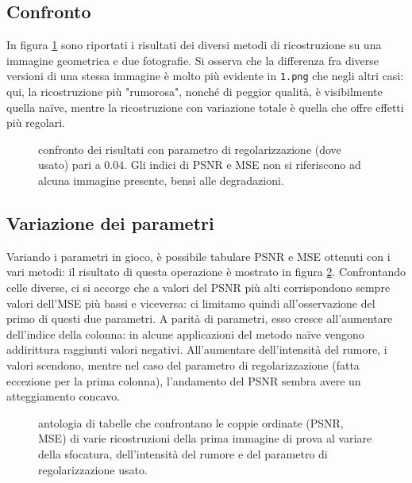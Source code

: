 \documentclass[a4paper]{article}
\begin{document}
\subsection{Confronto}
In figura \ref{fig:comparison} sono riportati i risultati dei diversi metodi di
ricostruzione su una immagine geometrica e due fotografie.
Si osserva che la differenza fra diverse versioni di una stessa immagine è molto
più evidente in \verb!1.png! che negli altri casi: qui, la ricostruzione più
"rumorosa", nonché di peggior qualità, è visibilmente quella naïve, mentre la
ricostruzione con variazione totale è quella che offre effetti più regolari.
\begin{figure}\label{fig:comparison}
   \begin{center}
       \vspace*{-1.1in}
       \centerline{\scalebox{1.3}{}}
   \end{center}
   \vspace*{-0.2in}
   \caption{confronto dei risultati con parametro di regolarizzazione (dove
   usato) pari a $0.04$. Gli indici di PSNR e MSE non si riferiscono ad alcuna
   immagine presente, bensì alle degradazioni.}
\end{figure}

\subsection{Variazione dei parametri}
Variando i parametri in gioco, è possibile tabulare PSNR e MSE ottenuti con i
vari metodi: il risultato di questa operazione è mostrato in figura
\ref{fig:parameters}.
Confrontando celle diverse, ci si accorge che a valori del PSNR più alti
corrispondono sempre valori dell'MSE più bassi e viceversa: ci limitamo quindi
all'osservazione del primo di questi due parametri. A parità di parametri, esso
cresce all'aumentare dell'indice della colonna: in alcune applicazioni del
metodo naïve vengono addirittura raggiunti valori negativi. All'aumentare
dell'intensità del rumore, i valori scendono, mentre nel caso del parametro di
regolarizzazione (fatta eccezione per la prima colonna), l'andamento del PSNR
sembra avere un atteggiamento concavo.
\begin{figure}\label{fig:parameters}
    \begin{center}
        \scalebox{0.65}{}
    \end{center}
    \begin{center}
        \scalebox{0.65}{}
    \end{center}
    \begin{center}
      \scalebox{0.65}{}
    \end{center}
  \caption{antologia di tabelle che confrontano le coppie ordinate (PSNR, MSE)
  di varie ricostruzioni della prima immagine di prova al variare della
  sfocatura, dell'intensità del rumore e del parametro di regolarizzazione
  usato.}
\end{figure}
\end{document}
